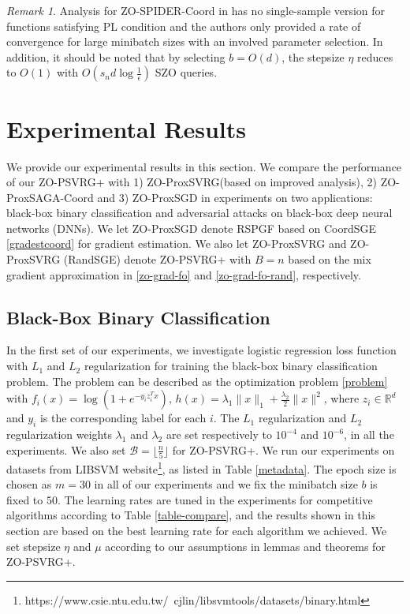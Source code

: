 \documentclass{article}
\newcommand*{\R}{\mathbb{R}}
\theoremstyle{definition}
\theoremstyle{remark}
\newtheorem{remark}[theorem]{Remark}
\begin{document}
\begin{remark}
Analysis for ZO-SPIDER-Coord in \cite{ji2019improved} has no single-sample version for functions satisfying PL condition and the authors only provided a rate of convergence for large minibatch sizes with an involved parameter selection. In addition, it should be noted that by selecting  $b = O(d)$, the stepsize $\eta$ reduces to $O(1)$ with $O(s_n d \log \frac{1}{\epsilon})$ SZO queries. 
\end{remark}

\section{Experimental Results}

We provide our experimental results in this section. We compare the performance of
our ZO-PSVRG+  with 1) ZO-ProxSVRG(based on improved analysis), 2) ZO-ProxSAGA-Coord \cite{gu2018faster} and 3) ZO-ProxSGD \cite{ghadimi2016accelerated} in experiments on two applications: black-box binary classification and adversarial attacks on black-box deep neural networks
(DNNs). We let ZO-ProxSGD denote RSPGF based on CoordSGE \eqref{gradestcoord} for gradient estimation. We also let ZO-ProxSVRG and ZO-ProxSVRG (RandSGE) denote ZO-PSVRG+ with $B = n$ based on the mix  gradient approximation in \eqref{zo-grad-fo} and \eqref{zo-grad-fo-rand}, respectively. 

\subsection{Black-Box Binary Classification}
In the first set of our experiments, we investigate logistic regression loss function with $L_1$ and $L_2$ regularization for training the black-box binary classification problem. The problem can be described as the optimization problem \eqref{problem} with $f_i(x) = \log(1+e^{-y_iz^T_i{x}})$, $h(x) = \lambda_1\|{x}\|_1 + \frac{\lambda_2}{2}\|{x}\|^2$, where $z_i\in\R^d$ and $y_i$ is the corresponding label for each $i$. The $L_1$ regularization and $L_2$ regularization weights $\lambda_1$ and $\lambda_2$ are set respectively to $10^{-4}$ and $10^{-6}$, in all the experiments. We also set $\mathcal{B} = \lfloor{\frac{n}{5}}\rfloor$ for ZO-PSVRG+. We run our experiments on datasets from LIBSVM website{\footnote{https://www.csie.ntu.edu.tw/~cjlin/libsvmtools/datasets/binary.html}}, as listed in Table \ref{metadata}. The epoch size  is chosen as $m = 30$ in all of our experiments and we fix the minibatch size  $b$ is fixed to $50$. The learning rates are tuned in the experiments for competitive algorithms  according to Table \ref{table-compare}, and the results shown in this section are based on the best learning rate for each algorithm we achieved. We set stepsize $\eta$ and $\mu$ according to our assumptions in lemmas and theorems for ZO-PSVRG+. 
\end{document}
